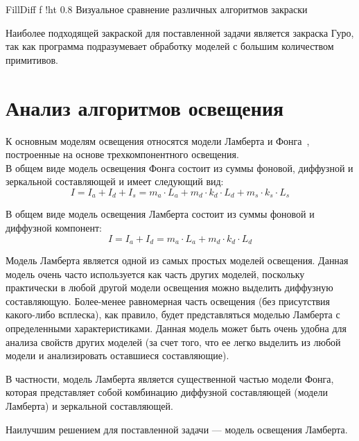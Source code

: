 {FillDiff}
{f}
{!ht}
{0.8\textwidth}
{Визуальное сравнение различных алгоритмов закраски}

\pagebreak

Наиболее подходящей закраской для поставленной задачи является закраска Гуро, так как программа подразумевает обработку моделей с большим количеством примитивов.

\section{Анализ алгоритмов освещения}

К основным моделям освещения относятся модели Ламберта и Фонга~\cite{Zadorozhnyi}, построенные на основе трехкомпонентного освещения.\\

В общем виде модель освещения Фонга состоит из суммы фоновой, диффузной и зеркальной составляющей и имеет следующий вид:
\begin{equation}
	I = I_{a} + I_{d} + I_{s} = m_{a} \cdot L_{a} + m_{d} \cdot k_{d} \cdot L_{d} + m_{s} \cdot k_{s} \cdot L_{s}
\end{equation}

\leavevmode

В общем виде модель освещения Ламберта состоит из суммы фоновой и диффузной компонент:
\begin{equation}
	I = I_{a} + I_{d} = m_{a} \cdot L_{a} + m_{d} \cdot k_{d} \cdot L_{d}
\end{equation}

Модель Ламберта является одной из самых простых моделей освещения. Данная модель очень часто используется как часть других моделей, поскольку практически в любой другой модели освещения можно выделить диффузную составляющую. Более-менее равномерная часть освещения (без присутствия какого-либо всплеска), как правило, будет представляться моделью Ламберта с определенными характеристиками. Данная модель может быть очень удобна для анализа свойств других моделей (за счет того, что ее легко выделить из любой модели и анализировать оставшиеся составляющие).

В частности, модель Ламберта является существенной частью модели Фонга, которая представляет собой комбинацию диффузной составляющей (модели Ламберта) и зеркальной составляющей.~\cite{Zadorozhnyi}

\leavevmode

Наилучшим решением для поставленной задачи --- модель освещения Ламберта.

